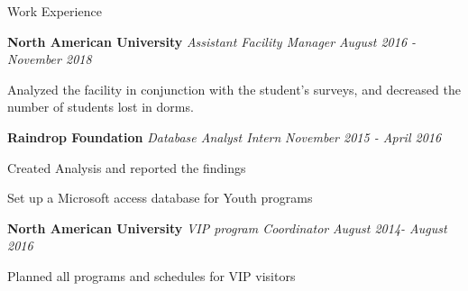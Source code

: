 \documentclass[10pt]{resume} %
\begin{document}

\begin{rSection}{Work Experience} \itemsep -2pt


{\bf North American University} \textit{Assistant Facility Manager} \hfill {\em August 2016 - November 2018} 
\item Analyzed the facility in conjunction with the student’s surveys, and decreased the number of students lost in dorms.

{\bf Raindrop Foundation} \textit{Database Analyst Intern} \hfill {\em November 2015 - April 2016} 
\item Created Analysis and reported the findings 
\item Set up a Microsoft access database for Youth programs


{\bf North American University} \textit{VIP program Coordinator} \hfill {\em August 2014- August 2016} 
\item Planned all programs and schedules for VIP visitors 


\end{rSection}
\end{document}
